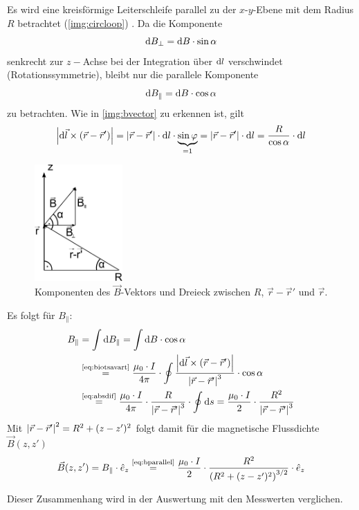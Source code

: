Es wird eine kreisförmige Leiterschleife parallel zu der $x$-$y$-Ebene
mit dem Radius $R$ betrachtet (\autoref{img:circloop}) \cite{dem2}.
Da die Komponente
\begin{equation}
\mathrm{d} B_\perp = \mathrm{d} B \cdot \sin \alpha
\end{equation}
senkrecht zur $z-$Achse bei der Integration über $\mathrm{d} l$ verschwindet 
(Rotationssymmetrie), bleibt nur die parallele Komponente
\begin{equation}
\mathrm{d} B_\parallel = \mathrm{d} B \cdot \cos \alpha
\end{equation}
zu betrachten. Wie in 
\autoref{img:bvector} zu erkennen ist, gilt
\begin{equation}
\label{eq:absdif}
  \left|\mathrm{d} \vec{l} \times \left( \vec{r} - \vec{r}' \right)\right| = \left|\vec{r} - \vec{r}'\right| \cdot \mathrm{d} l \cdot \underbrace{\sin \varphi}_{= 1} 
  = \left|\vec{r} - \vec{r}'\right| \cdot \mathrm{d} l = \frac{R}{\cos \alpha} \cdot \mathrm{d} l
\end{equation}
\begin{figure}[H]
\begin{center}
  \includegraphics[width=0.3\textwidth]{../img/bvector.pdf}
  \caption{Komponenten des $\vec{B}$-Vektors und Dreieck zwischen $R$, $\vec{r}-\vec{r}'$ und $\vec{r}$.}
  \label{img:bvector}
\end{center}
\end{figure}
Es folgt für $B_\parallel$:
\begin{equation}
\begin{split}
  \label{eq:bparallel}
    B_\parallel &= \int \difd B_\parallel = \int \difd B \cdot \cos \alpha \\
  &\refeq{eq:biotsavart} \frac{\mu_0 \cdot I}{4 \pi} \cdot \oint \frac{\abs{\difd \vec{l} \times \left( \vec{r} - \vec{r}' \right)}}{\abs{\vec{r} - \vec{r}'}^3} \cdot \cos \alpha \\
  &\refeq{eq:absdif} \frac{\mu_0 \cdot I}{4 \pi} \cdot \frac{R}{\abs{\vec{r} - \vec{r}'}^3} \cdot \oint \difd s = \frac{\mu_0 \cdot I}{2} \cdot \frac{R^2}{\abs{\vec{r} - \vec{r}'}^3}
\end{split}
\end{equation}
Mit $\left|\vec{r} - \vec{r}'\right|^2 = R^2 + (z-z')^2$ folgt damit für die magnetische Flussdichte $\vec{B}(z, z')$
\begin{equation}
  \label{eq:Bz:biotsavart}
  \vec{B}(z, z') = B_\parallel \cdot \hat{e}_z \refeq{eq:bparallel} \frac{\mu_0 \cdot I}{2} \cdot \frac{R^2}{ \left( R^2 + (z-z')^2 \right)^{3/2}} \cdot \hat{e}_z
\end{equation}

Dieser Zusammenhang wird in der Auswertung mit den Messwerten verglichen.

